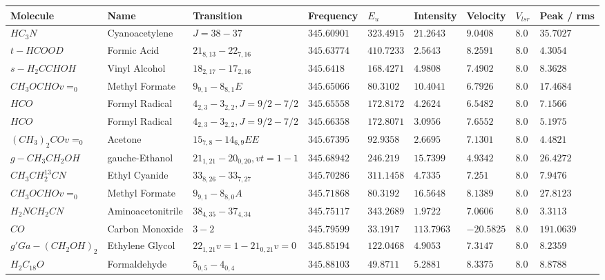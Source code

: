 \documentclass[10pt]{article}
\begin{document}
\begin{table}[htb]
\small
    \centering    
    \begin{tabular}{l l l l l l l l l} 

    
    \hline
Molecule & Name & Transition & Frequency & $E_{{u}}$ & Intensity & Velocity & $V_{{lsr}}$ & Peak / rms \\
\hline
$HC_{3}N$ & Cyanoacetylene & $J=38-37$ & $345.60901$ & $323.4915$ & $21.2643$ & $9.0408$ & $8.0$ & $35.7027$\\
$t-HCOOD$ & Formic Acid & $21_{8,13}-22_{7,16}$ & $345.63774$ & $410.7233$ & $2.5643$ & $8.2591$ & $8.0$ & $4.3054$\\
$s-H_{2}CCHOH$ & Vinyl Alcohol & $18_{2,17}-17_{2,16}$ & $345.6418$ & $168.4271$ & $4.9808$ & $7.4902$ & $8.0$ & $8.3628$\\
$CH_{3}OCHOv=_{0}$ & Methyl Formate & $9_{9,1}-8_{8,1}E$ & $345.65066$ & $80.3102$ & $10.4041$ & $6.7926$ & $8.0$ & $17.4684$\\
$HCO$ & Formyl Radical & $4_{2,3}-3_{2,2},J=9/2-7/2$ & $345.65558$ & $172.8172$ & $4.2624$ & $6.5482$ & $8.0$ & $7.1566$\\
$HCO$ & Formyl Radical & $4_{2,3}-3_{2,2},J=9/2-7/2$ & $345.66358$ & $172.8071$ & $3.0956$ & $7.6552$ & $8.0$ & $5.1975$\\
$(CH_{3})_{2}COv=_{0}$ & Acetone & $15_{7,8}-14_{6,9}EE$ & $345.67395$ & $92.9358$ & $2.6695$ & $7.1301$ & $8.0$ & $4.4821$\\
$g-CH_{3}CH_{2}OH$ & gauche-Ethanol & $21_{1,21}-20_{0,20},vt=1-1$ & $345.68942$ & $246.219$ & $15.7399$ & $4.9342$ & $8.0$ & $26.4272$\\
$CH_{3}CH_{2}^{13}CN$ & Ethyl Cyanide & $33_{8,26}-33_{7,27}$ & $345.70286$ & $311.1458$ & $4.7335$ & $7.251$ & $8.0$ & $7.9476$\\
$CH_{3}OCHOv=_{0}$ & Methyl Formate & $9_{9,1}-8_{8,0}A$ & $345.71868$ & $80.3192$ & $16.5648$ & $8.1389$ & $8.0$ & $27.8123$\\
$H_{2}NCH_{2}CN$ & Aminoacetonitrile & $38_{4,35}-37_{4,34}$ & $345.75117$ & $343.2689$ & $1.9722$ & $7.0606$ & $8.0$ & $3.3113$\\
$CO$ & Carbon Monoxide & $3-2$ & $345.79599$ & $33.1917$ & $113.7963$ & $-20.5825$ & $8.0$ & $191.0639$\\
$g'Ga-(CH_{2}OH)_{2}$ & Ethylene Glycol & $22_{1,21}v=1-21_{0,21}v=0$ & $345.85194$ & $122.0468$ & $4.9053$ & $7.3147$ & $8.0$ & $8.2359$\\
$H_{2}C_{18}O$ & Formaldehyde & $5_{0,5}-4_{0,4}$ & $345.88103$ & $49.8711$ & $5.2881$ & $8.3375$ & $8.0$ & $8.8788$\\

\end{tabular}
\end{table}
\end{document}
